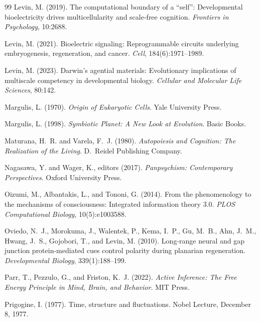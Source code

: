 \documentclass[12pt,a4paper]{article}
\begin{document}
\begin{thebibliography}{99}
Levin, M. (2019).
\newblock The computational boundary of a ``self'': Developmental
  bioelectricity drives multicellularity and scale-free cognition.
\newblock \emph{Frontiers in Psychology}, 10:2688.

Levin, M. (2021).
\newblock Bioelectric signaling: Reprogrammable circuits underlying
  embryogenesis, regeneration, and cancer.
\newblock \emph{Cell}, 184(6):1971--1989.

Levin, M. (2023).
\newblock Darwin's agential materials: Evolutionary implications of
  multiscale competency in developmental biology.
\newblock \emph{Cellular and Molecular Life Sciences}, 80:142.

Margulis, L. (1970).
\newblock \emph{Origin of Eukaryotic Cells}.
\newblock Yale University Press.

Margulis, L. (1998).
\newblock \emph{Symbiotic Planet: A New Look at Evolution}.
\newblock Basic Books.

Maturana, H.~R. and Varela, F.~J. (1980).
\newblock \emph{Autopoiesis and Cognition: The Realization of the Living}.
\newblock D.~Reidel Publishing Company.

Nagasawa, Y. and Wager, K., editors (2017).
\newblock \emph{Panpsychism: Contemporary Perspectives}.
\newblock Oxford University Press.

Oizumi, M., Albantakis, L., and Tononi, G. (2014).
\newblock From the phenomenology to the mechanisms of consciousness:
  Integrated information theory 3.0.
\newblock \emph{PLOS Computational Biology}, 10(5):e1003588.

Oviedo, N.~J., Morokuma, J., Walentek, P., Kema, I.~P., Gu, M.~B.,
  Ahn, J.~M., Hwang, J.~S., Gojobori, T., and Levin, M. (2010).
\newblock Long-range neural and gap junction protein-mediated cues
  control polarity during planarian regeneration.
\newblock \emph{Developmental Biology}, 339(1):188--199.

Parr, T., Pezzulo, G., and Friston, K.~J. (2022).
\newblock \emph{Active Inference: The Free Energy Principle in Mind,
  Brain, and Behavior}.
\newblock MIT Press.

Prigogine, I. (1977).
\newblock Time, structure and fluctuations.
\newblock Nobel Lecture, December 8, 1977.


\end{thebibliography}
\end{document}
